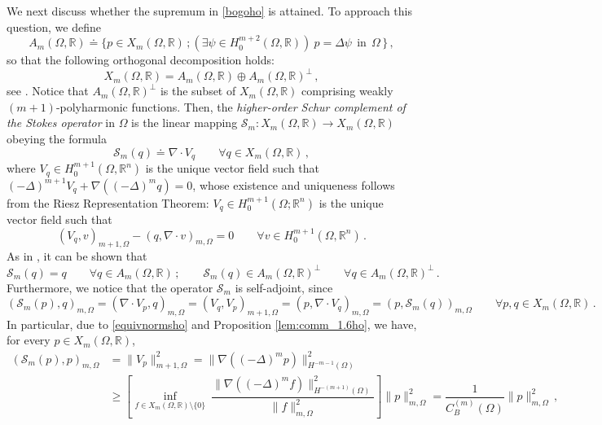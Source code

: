 \documentclass[11pt]{article}
\theoremstyle{plain}
\theoremstyle{definition}
\numberwithin{equation}{section}
\begin{document}
We next discuss whether the supremum in \eqref{bogoho} is attained. To approach this question, we define
$$
A_{m}(\Omega, \mathbb{R}) \doteq \{ p \in X_{m}(\Omega, \mathbb{R}) \, ; (\exists \psi \in H_{0}^{m+2}(\Omega, \mathbb{R})) \ p = \Delta \psi \ \ \text{in} \ \ \Omega \, \} \, ,
$$
so that the following orthogonal decomposition holds:
\begin{equation} \label{decompl02ho}
X_{m}(\Omega, \mathbb{R}) = A_{m}(\Omega, \mathbb{R}) \oplus A_{m}(\Omega, \mathbb{R})^{\perp} \, ,
\end{equation}
see \cite[Part II]{riedl2010cosserat}. Notice that $A_{m}(\Omega, \mathbb{R})^{\perp}$ is the subset of $X_{m}(\Omega, \mathbb{R})$ comprising weakly $(m+1)$-polyharmonic functions. Then, the \textit{higher-order Schur complement of the Stokes operator} in $\Omega$ is the linear mapping $\mathcal{S}_{m} : X_{m}(\Omega, \mathbb{R}) \longrightarrow X_{m}(\Omega, \mathbb{R})$ obeying the formula
$$
\mathcal{S}_{m}(q) \doteq \nabla \cdot V_{q} \qquad \forall q \in X_{m}(\Omega, \mathbb{R}) \, ,
$$
where $V_{q} \in H_{0}^{m+1}(\Omega, \mathbb{R}^{n})$ is the unique vector field such that
$(-\Delta)^{m+1} V_{q} + \nabla ((-\Delta)^{m} q) = 0$,
whose existence and uniqueness follows from the Riesz Representation Theorem: $V_{q} \in H_{0}^{m+1}(\Omega; \mathbb{R}^{n})$ is the unique vector field such that
\begin{equation} \label{schurm0}
	(V_{q},v)_{m+1, \Omega} - (q,\nabla \cdot v)_{m, \Omega} = 0 \qquad \forall v \in H_{0}^{m+1}(\Omega, \mathbb{R}^{n}) \, .
\end{equation}
As in \cite[Theorem 1.2 and the subsequent remark]{riedl2013cosserat}, it can be shown that
\begin{equation} \label{sondecompho}
	\mathcal{S}_{m}(q) = q \qquad \forall q \in A_{m}(\Omega, \mathbb{R}) \, ; \qquad \mathcal{S}_{m}(q) \in A_{m}(\Omega, \mathbb{R})^{\perp} \qquad \forall q \in A_{m}(\Omega, \mathbb{R})^{\perp} \, .
\end{equation}
Furthermore, we notice that the operator $\mathcal{S}_{m}$ is self-adjoint, since
$$
(\mathcal{S}_{m}(p),q)_{m, \Omega} = (\nabla \cdot V_{p},q)_{m, \Omega} = (V_{q},V_{p})_{m+1, \Omega} = (p,\nabla \cdot V_{q})_{m, \Omega} = (p, \mathcal{S}_{m}(q))_{m, \Omega} \qquad \forall p,q \in X_{m}(\Omega, \mathbb{R}) \, .
$$
In particular, due to \eqref{equivnormsho} and Proposition \ref{lem:comm_1.6ho}, we have, for every $p \in X_{m}(\Omega, \mathbb{R})$,
$$
\begin{aligned}
	(\mathcal{S}_{m}(p),p)_{m, \Omega} & = \|V_{p}\|_{m+1,\Omega}^2 = \|\nabla ((-\Delta)^{m} p)\|_{H^{-m-1}(\Omega)}^2 \\[6pt]
	& \geq \left[ \inf_{f\in X_{m}(\Omega, \mathbb{R}) \setminus \{0\}} \ \dfrac{\|\nabla ((-\Delta)^{m} f)\|_{H^{-(m+1)}(\Omega)}^2}{\|f\|_{m,\Omega}^2} \right] \|p\|_{m,\Omega}^2 = \dfrac{1}{C^{(m)}_{B}(\Omega)} \|p\|_{m,\Omega}^2 \, ,
\end{aligned}
$$
\end{document}

